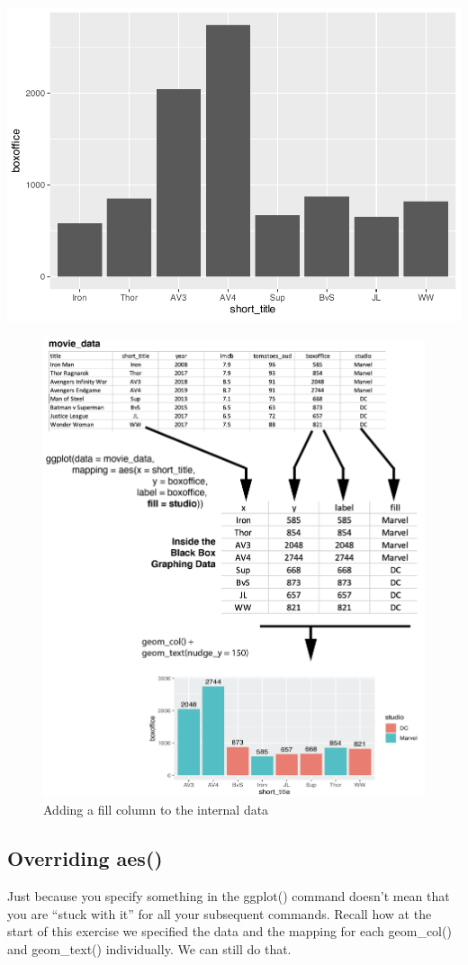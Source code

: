\documentclass[
]{krantz}
\begin{document}
\includegraphics[width=0.65\linewidth]{bookdown_files/figure-latex/unnamed-chunk-110-1}

\begin{figure}
\includegraphics[width=0.7\linewidth]{ch_graphing/images/mapping_fill} \caption{Adding a fill column to the internal data}\label{fig:addfill}
\end{figure}

\hypertarget{overriding-aes}{%
\subsection{Overriding aes()}\label{overriding-aes}}

Just because you specify something in the ggplot() command doesn't mean that you are ``stuck with it'' for all your subsequent commands. Recall how at the start of this exercise we specified the data and the mapping for each geom\_col() and geom\_text() individually. We can still do that.
\end{document}
